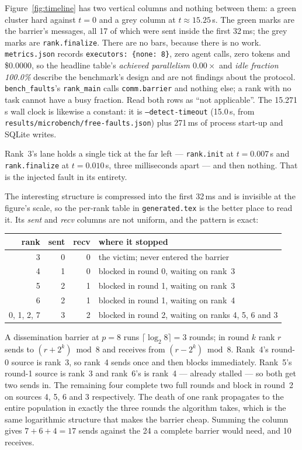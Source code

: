 \documentclass[11pt]{article}
\begin{document}
Figure~\ref{fig:timeline} has two vertical columns and nothing between them: a green
cluster hard against $t=0$ and a grey column at $t\approx15.25$\,s. The green marks are
the barrier's messages, all 17 of which were sent inside the first 32\,ms; the grey marks
are \texttt{rank.finalize}. There are no bars, because there is no work.
\texttt{metrics.json} records \texttt{executors: \{none: 8\}}, zero agent calls, zero
tokens and \$0.0000, so the headline table's \emph{achieved parallelism $0.00\times$} and
\emph{idle fraction 100.0\%} describe the benchmark's design and are not findings about
the protocol. \texttt{bench\_faults}'s \texttt{rank\_main} calls \texttt{comm.barrier} and
nothing else; a rank with no task cannot have a busy fraction. Read both rows as ``not
applicable''. The 15.271\,s wall clock is likewise a constant: it is
\texttt{--detect-timeout} (15.0\,s, from \texttt{results/microbench/free-faults.json})
plus 271\,ms of process start-up and SQLite writes.

Rank~3's lane holds a single tick at the far left --- \texttt{rank.init} at $t=0.007$\,s
and \texttt{rank.finalize} at $t=0.010$\,s, three milliseconds apart --- and then nothing.
That is the injected fault in its entirety.

The interesting structure is compressed into the first 32\,ms and is invisible at the
figure's scale, so the per-rank table in \texttt{generated.tex} is the better place to
read it. Its \emph{sent} and \emph{recv} columns are not uniform, and the pattern is
exact:

\begin{center}\footnotesize
\begin{tabular}{@{}rrrl@{}}
\toprule
rank & sent & recv & where it stopped \\
\midrule
3 & 0 & 0 & the victim; never entered the barrier \\
4 & 1 & 0 & blocked in round 0, waiting on rank~3 \\
5 & 2 & 1 & blocked in round 1, waiting on rank~3 \\
6 & 2 & 1 & blocked in round 1, waiting on rank~4 \\
0, 1, 2, 7 & 3 & 2 & blocked in round 2, waiting on ranks 4, 5, 6 and 3 \\
\bottomrule
\end{tabular}\normalsize
\end{center}

A dissemination barrier at $p=8$ runs $\lceil \log_2 8 \rceil = 3$ rounds; in round $k$
rank $r$ sends to $(r + 2^k) \bmod 8$ and receives from $(r - 2^k) \bmod 8$. Rank~4's
round-0 source is rank~3, so rank~4 sends once and then blocks immediately. Rank~5's
round-1 source is rank~3 and rank~6's is rank~4 --- already stalled --- so both get two
sends in. The remaining four complete two full rounds and block in round~2 on sources 4,
5, 6 and 3 respectively. The death of one rank propagates to the entire population in
exactly the three rounds the algorithm takes, which is the same logarithmic structure
that makes the barrier cheap. Summing the column gives $7 + 6 + 4 = 17$ sends against the
24 a complete barrier would need, and 10 receives.
\end{document}
